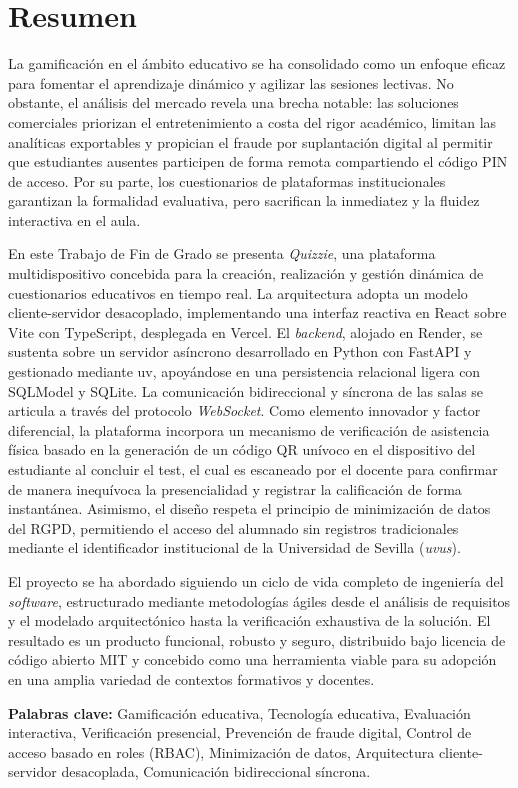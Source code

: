 \chapter*{Resumen}

La gamificación en el ámbito educativo se ha consolidado como un enfoque eficaz para fomentar el aprendizaje dinámico y agilizar las sesiones lectivas. No obstante, el análisis del mercado revela una brecha notable: las soluciones comerciales priorizan el entretenimiento a costa del rigor académico, limitan las analíticas exportables y propician el fraude por suplantación digital al permitir que estudiantes ausentes participen de forma remota compartiendo el código PIN de acceso. Por su parte, los cuestionarios de plataformas institucionales garantizan la formalidad evaluativa, pero sacrifican la inmediatez y la fluidez interactiva en el aula.

En este Trabajo de Fin de Grado se presenta \textit{Quizzie}, una plataforma multidispositivo concebida para la creación, realización y gestión dinámica de cuestionarios educativos en tiempo real. La arquitectura adopta un modelo cliente-servidor desacoplado, implementando una interfaz reactiva en React sobre Vite con TypeScript, desplegada en Vercel. El \textit{backend}, alojado en Render, se sustenta sobre un servidor asíncrono desarrollado en Python con FastAPI y gestionado mediante uv, apoyándose en una persistencia relacional ligera con SQLModel y SQLite. La comunicación bidireccional y síncrona de las salas se articula a través del protocolo \textit{WebSocket}. Como elemento innovador y factor diferencial, la plataforma incorpora un mecanismo de verificación de asistencia física basado en la generación de un código QR unívoco en el dispositivo del estudiante al concluir el test, el cual es escaneado por el docente para confirmar de manera inequívoca la presencialidad y registrar la calificación de forma instantánea. Asimismo, el diseño respeta el principio de minimización de datos del RGPD, permitiendo el acceso del alumnado sin registros tradicionales mediante el identificador institucional de la Universidad de Sevilla (\textit{uvus}).

El proyecto se ha abordado siguiendo un ciclo de vida completo de ingeniería del \textit{software}, estructurado mediante metodologías ágiles desde el análisis de requisitos y el modelado arquitectónico hasta la verificación exhaustiva de la solución. El resultado es un producto funcional, robusto y seguro, distribuido bajo licencia de código abierto MIT y concebido como una herramienta viable para su adopción en una amplia variedad de contextos formativos y docentes.

\vspace{0.5cm}

\textbf{Palabras clave:} Gamificación educativa, Tecnología educativa, Evaluación interactiva, Verificación presencial, Prevención de fraude digital, Control de acceso basado en roles (RBAC), Minimización de datos, Arquitectura cliente-servidor desacoplada, Comunicación bidireccional síncrona.